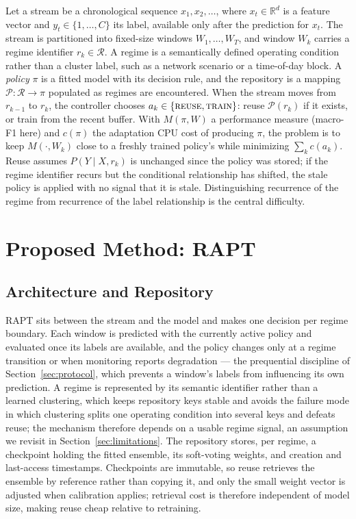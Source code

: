 \documentclass[conference]{IEEEtran}
\begin{document}
Let a stream be a chronological sequence $x_1, x_2, \dots$, where
$x_t \in \mathbb{R}^d$ is a feature vector and $y_t \in \{1,\dots,C\}$ its label,
available only after the prediction for $x_t$. The stream is partitioned into
fixed-size windows $W_1, \dots, W_T$, and window $W_k$ carries a regime identifier
$r_k \in \mathcal{R}$. A regime is a semantically defined operating condition
rather than a cluster label, such as a network scenario or a time-of-day block. A
\emph{policy} $\pi$ is a fitted model with its decision rule, and the repository is a
mapping $\mathcal{P}: \mathcal{R} \rightarrow \pi$ populated as regimes are
encountered. When the stream moves from $r_{k-1}$ to $r_k$, the controller chooses
$a_k \in \{\textsc{reuse}, \textsc{train}\}$: reuse $\mathcal{P}(r_k)$ if it exists, or
train from the recent buffer. With $M(\pi, W)$ a performance measure (macro-F1 here)
and $c(\pi)$ the adaptation CPU cost of producing $\pi$, the problem is to keep
$M(\cdot, W_k)$ close to a freshly trained policy's while minimizing $\sum_k c(a_k)$.
Reuse assumes $P(Y \mid X, r_k)$ is unchanged since the policy was stored; if the
regime identifier recurs but the conditional relationship has shifted, the stale
policy is applied with no signal that it is stale. Distinguishing recurrence of the
regime from recurrence of the label relationship is the central difficulty.

\section{Proposed Method: RAPT}

\subsection{Architecture and Repository}
RAPT sits between the stream and the model and makes one decision per regime
boundary. Each window is predicted with the currently active policy and evaluated
once its labels are available, and the policy changes only at a regime transition or
when monitoring reports degradation --- the prequential discipline of
Section~\ref{sec:protocol}, which prevents a window's labels from influencing its own
prediction. A regime is represented by its semantic identifier rather than a learned
clustering, which keeps repository keys stable and avoids the failure mode in which
clustering splits one operating condition into several keys and defeats reuse; the
mechanism therefore depends on a usable regime signal, an assumption we revisit in
Section~\ref{sec:limitations}. The repository stores, per regime, a checkpoint
holding the fitted ensemble, its soft-voting weights, and creation and last-access
timestamps. Checkpoints are immutable, so reuse retrieves the ensemble by reference
rather than copying it, and only the small weight vector is adjusted when calibration
applies; retrieval cost is therefore independent of model size, making reuse cheap
relative to retraining.
\end{document}
